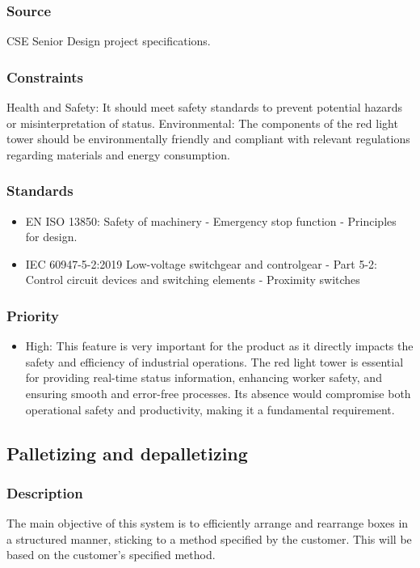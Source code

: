 \subsubsection{Source}
CSE Senior Design project specifications.
\subsubsection{Constraints}
Health and Safety: It should meet safety standards to prevent potential hazards or misinterpretation of status.
Environmental: The components of the red light tower should be environmentally friendly and compliant with relevant regulations regarding materials and energy consumption.
\subsubsection{Standards}
\begin{itemize}
\item EN ISO 13850: Safety of machinery - Emergency stop function - Principles for design.
\item IEC 60947-5-2:2019 Low-voltage switchgear and controlgear - Part 5-2: Control circuit devices and switching elements - Proximity switches
\end{itemize}
\subsubsection{Priority}
\begin{itemize}
\item High:
This feature is very important for the product as it directly impacts the safety and efficiency of industrial operations. The red light tower is essential for providing real-time status information, enhancing worker safety, and ensuring smooth and error-free processes. Its absence would compromise both operational safety and productivity, making it a fundamental requirement.
\end{itemize}

\subsection{Palletizing and depalletizing}
\subsubsection{Description}
The main objective of this system is to efficiently arrange and rearrange boxes in a structured manner, sticking to a method specified by the customer. This will be based on the customer's specified method. 
